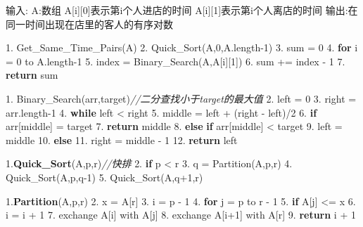 \documentclass[
]{article}
\newenvironment{Shaded}{}{}
\newcommand{\CommentTok}[1]{\textcolor[rgb]{0.38,0.63,0.69}{\textit{#1}}}
\newcommand{\ControlFlowTok}[1]{\textcolor[rgb]{0.00,0.44,0.13}{\textbf{#1}}}
\newcommand{\DecValTok}[1]{\textcolor[rgb]{0.25,0.63,0.44}{#1}}
\newcommand{\ErrorTok}[1]{\textcolor[rgb]{1.00,0.00,0.00}{\textbf{#1}}}
\newcommand{\FloatTok}[1]{\textcolor[rgb]{0.25,0.63,0.44}{#1}}
\newcommand{\NormalTok}[1]{#1}
\begin{document}
\begin{Shaded}
\begin{Highlighting}[]
\NormalTok{输入:}
\NormalTok{A:数组}
\NormalTok{  A[i][}\DecValTok{0}\NormalTok{]表示第i个人进店的时间}
\NormalTok{  A[i][}\DecValTok{1}\NormalTok{]表示第i个人离店的时间}
\NormalTok{输出:在同一时间出现在店里的客人的有序对数}
  
\FloatTok{1.}\NormalTok{ Get\_Same\_Time\_Pairs(A)}
\FloatTok{2.}\NormalTok{ 	Quick\_Sort(A,}\DecValTok{0}\NormalTok{,A.length{-}}\DecValTok{1}\NormalTok{)}
\FloatTok{3.}\NormalTok{   sum = }\DecValTok{0}
\FloatTok{4.}   \ControlFlowTok{for}\NormalTok{ i = }\DecValTok{0}\NormalTok{ to A.length{-}}\DecValTok{1}
\FloatTok{5.}\NormalTok{     index = Binary\_Search(A,A[i][}\DecValTok{1}\NormalTok{])}
\FloatTok{6.}\NormalTok{     sum += index {-} }\DecValTok{1}
\FloatTok{7.}   \ControlFlowTok{return}\NormalTok{ sum}
  

\FloatTok{1.}\NormalTok{ Binary\_Search(arr,target)}\CommentTok{//二分查找小于target的最大值}
\FloatTok{2.}\NormalTok{   left = }\DecValTok{0}
\FloatTok{3.}\NormalTok{   right = arr.length{-}}\DecValTok{1}
\FloatTok{4.}   \ControlFlowTok{while}\NormalTok{ left \textless{} right}
\FloatTok{5.}\NormalTok{     middle = left + (right {-} left)/}\DecValTok{2}
\FloatTok{6.}     \ControlFlowTok{if}\NormalTok{ arr[middle] = target}
\FloatTok{7.}       \ControlFlowTok{return}\NormalTok{ middle}
\FloatTok{8.}     \ControlFlowTok{else} \ControlFlowTok{if}\NormalTok{ arr[middle] \textless{} target}
\FloatTok{9.}\NormalTok{       left = middle}
\FloatTok{10.}    \ControlFlowTok{else}
\FloatTok{11.}\NormalTok{      right = middle {-} }\DecValTok{1}
\FloatTok{12.}  \ControlFlowTok{return}\NormalTok{ left}
      
\FloatTok{1.}\ErrorTok{Quick\_Sort}\NormalTok{(A,p,r)}\CommentTok{//快排}
\FloatTok{2.}	\ControlFlowTok{if}\NormalTok{ p \textless{} r}
\FloatTok{3.}\NormalTok{    q = Partition(A,p,r)}
\FloatTok{4.}\NormalTok{    Quick\_Sort(A,p,q{-}}\DecValTok{1}\NormalTok{)}
\FloatTok{5.}\NormalTok{    Quick\_Sort(A,q+}\DecValTok{1}\NormalTok{,r)}
    
\FloatTok{1.}\ErrorTok{Partition}\NormalTok{(A,p,r)}
\FloatTok{2.}\NormalTok{  x = A[r]}
\FloatTok{3.}\NormalTok{  i = p {-} }\DecValTok{1}
\FloatTok{4.}  \ControlFlowTok{for}\NormalTok{ j = p to r {-} }\DecValTok{1}
\FloatTok{5.}    \ControlFlowTok{if}\NormalTok{ A[j] \textless{}= x}
\FloatTok{6.}\NormalTok{      i = i + }\DecValTok{1}
\FloatTok{7.}\NormalTok{      exchange A[i] with A[j]}
\FloatTok{8.}\NormalTok{  exchange A[i+}\DecValTok{1}\NormalTok{] with A[r]}
\FloatTok{9.}  \ControlFlowTok{return}\NormalTok{ i + }\DecValTok{1}
\end{Highlighting}
\end{Shaded}
\end{document}
